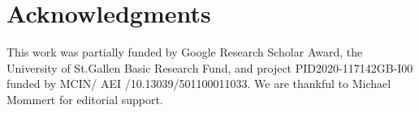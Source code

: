 \documentclass{article}
\begin{document}
\section*{Acknowledgments}
This work was partially funded by Google Research Scholar Award, the University of St.Gallen Basic Research Fund, and project PID2020-117142GB-I00 funded by MCIN/ AEI /10.13039/501100011033.
We are thankful to Michael Mommert for editorial support.

\newpage


% 
% 









\appendix



\end{document}
